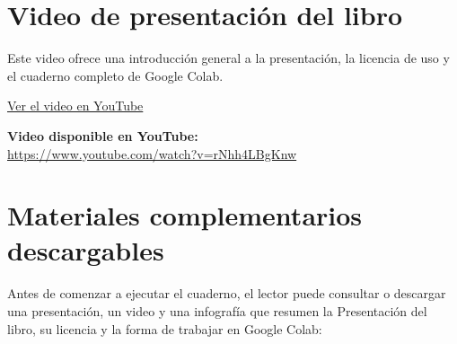 \documentclass[
  spanish,
  10.5pt,
  letterpaper,
  openany,
  headings=big]{scrbook}
\begin{document}
\section*{Video de presentación del
libro}\label{video-de-presentaciuxf3n-del-libro-2}


Este video ofrece una introducción general a la presentación, la
licencia de uso y el cuaderno completo de Google Colab.

\href{https://www.youtube.com/watch?v=rNhh4LBgKnw}{Ver el video en
YouTube}

\textbf{Video disponible en YouTube:}\\
\url{https://www.youtube.com/watch?v=rNhh4LBgKnw}

\section*{Materiales complementarios
descargables}\label{materiales-complementarios-descargables-2}


Antes de comenzar a ejecutar el cuaderno, el lector puede consultar o
descargar una presentación, un video y una infografía que resumen la
Presentación del libro, su licencia y la forma de trabajar en Google
Colab:
\end{document}
